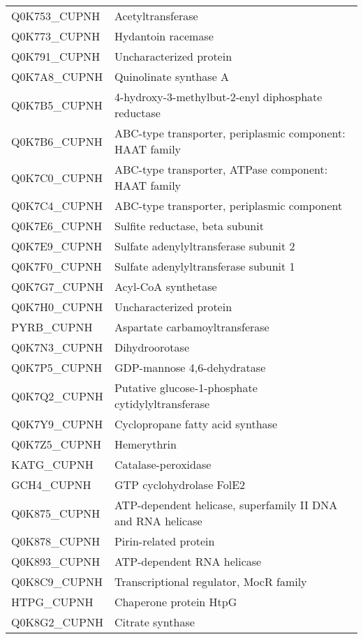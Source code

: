 \begin{center}
\begin{longtable}{ l l }
Q0K753\_CUPNH & Acetyltransferase \\ [0.5ex]
Q0K773\_CUPNH & Hydantoin racemase \\ [0.5ex]
Q0K791\_CUPNH & Uncharacterized protein \\ [0.5ex]
Q0K7A8\_CUPNH & Quinolinate synthase A \\ [0.5ex]
Q0K7B5\_CUPNH & 4-hydroxy-3-methylbut-2-enyl diphosphate reductase \\ [0.5ex]
Q0K7B6\_CUPNH & ABC-type transporter, periplasmic component: HAAT family \\ [0.5ex]
Q0K7C0\_CUPNH & ABC-type transporter, ATPase component: HAAT family \\ [0.5ex]
Q0K7C4\_CUPNH & ABC-type transporter, periplasmic component \\ [0.5ex]
Q0K7E6\_CUPNH & Sulfite reductase, beta subunit \\ [0.5ex]
Q0K7E9\_CUPNH & Sulfate adenylyltransferase subunit 2 \\ [0.5ex]
Q0K7F0\_CUPNH & Sulfate adenylyltransferase subunit 1 \\ [0.5ex]
Q0K7G7\_CUPNH & Acyl-CoA synthetase \\ [0.5ex]
Q0K7H0\_CUPNH & Uncharacterized protein \\ [0.5ex]
PYRB\_CUPNH & Aspartate carbamoyltransferase \\ [0.5ex]
Q0K7N3\_CUPNH & Dihydroorotase \\ [0.5ex]
Q0K7P5\_CUPNH & GDP-mannose 4,6-dehydratase \\ [0.5ex]
Q0K7Q2\_CUPNH & Putative glucose-1-phosphate cytidylyltransferase \\ [0.5ex]
Q0K7Y9\_CUPNH & Cyclopropane fatty acid synthase \\ [0.5ex]
Q0K7Z5\_CUPNH & Hemerythrin \\ [0.5ex]
KATG\_CUPNH & Catalase-peroxidase \\ [0.5ex]
GCH4\_CUPNH & GTP cyclohydrolase FolE2 \\ [0.5ex]
Q0K875\_CUPNH & ATP-dependent helicase, superfamily II DNA and RNA helicase \\ [0.5ex]
Q0K878\_CUPNH & Pirin-related protein \\ [0.5ex]
Q0K893\_CUPNH & ATP-dependent RNA helicase \\ [0.5ex]
Q0K8C9\_CUPNH & Transcriptional regulator, MocR family \\ [0.5ex]
HTPG\_CUPNH & Chaperone protein HtpG \\ [0.5ex]
Q0K8G2\_CUPNH & Citrate synthase \\ [0.5ex]

\end{longtable}
\end{center}
